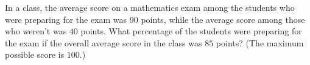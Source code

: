 In a class, the average score on a mathematics exam among the students who were preparing for the exam was $90$ points, while the average score among those who weren't was $40$ points. What percentage of the students were preparing for the exam if the overall average score in the class was $85$ points? (The maximum possible score is $100$.)
